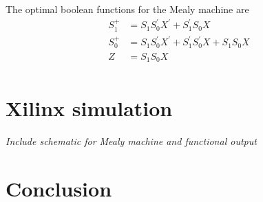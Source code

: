 \documentclass[11pt]{article}
\begin{document}
The optimal boolean functions for the Mealy machine are
\begin{align*}
	S_1^+ &= S_1 S_0^\prime X^\prime + S_1^\prime S_0 X \\
	S_0^+ &= S_1 S_0^\prime X^\prime + S_1^\prime S_0^\prime X + S_1 S_0 X\\
		Z &= S_1 S_0 X\\
\end{align*}

\section{Xilinx simulation}
{\em Include schematic for Mealy machine and functional output}

\section{Conclusion}
\end{document}
